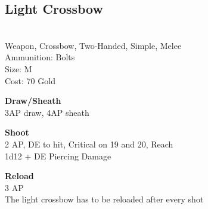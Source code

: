 \subsection{Light Crossbow}\label{weapon:lightCrossbow}\\
Weapon, Crossbow, Two-Handed, Simple, Melee\\
Ammunition: Bolts\\
Size: M\\
Cost: 70 Gold

\textbf{Draw/Sheath} \\
3AP draw, 4AP sheath

\textbf{Shoot} \\
2 AP, DE to hit, Critical on 19 and 20,  Reach\\
1d12 + \texttimes DE Piercing Damage

\textbf{Reload} \\
3 AP\\
The light crossbow has to be reloaded after every shot

